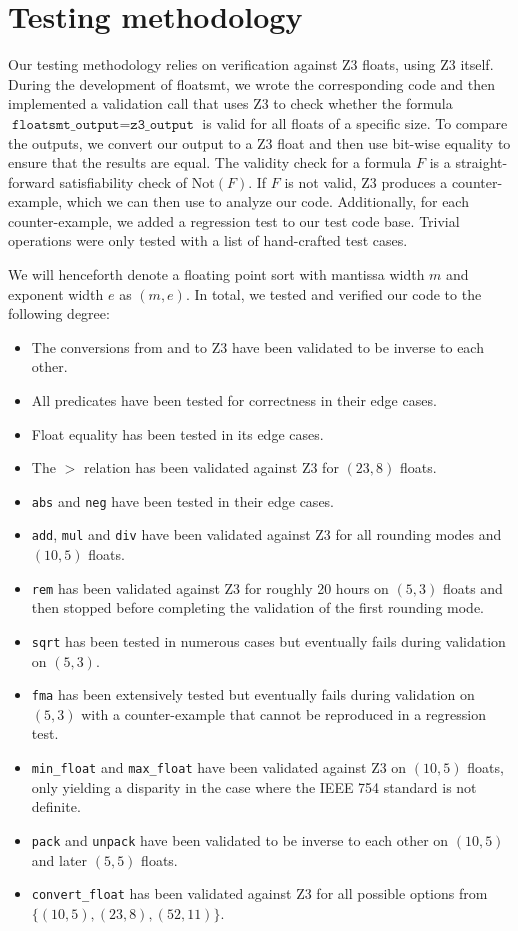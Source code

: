 \documentclass[a4paper,UKenglish,cleveref, autoref, thm-restate]{lipics-v2019}
\begin{document}
\section{Testing methodology}
Our testing methodology relies on verification against Z3 floats, using Z3 itself. During the development of floatsmt, we wrote the corresponding code and then implemented a validation call that uses Z3 to check whether the formula $\texttt{floatsmt\_output} = \texttt{z3\_output}$ is valid for all floats of a specific size. To compare the outputs, we convert our output to a Z3 float and then use bit-wise equality to ensure that the results are equal. The validity check for a formula $F$ is a straight-forward satisfiability check of $\text{Not}(F)$. If $F$ is not valid, Z3 produces a counter-example, which we can then use to analyze our code. Additionally, for each counter-example, we added a regression test to our test code base. Trivial operations were only tested with a list of hand-crafted test cases.

We will henceforth denote a floating point sort with mantissa width $m$ and exponent width $e$ as $(m, e)$. In total, we tested and verified our code to the following degree:
\begin{itemize}
	\item The conversions from and to Z3 have been validated to be inverse to each other.
	\item All predicates have been tested for correctness in their edge cases.
	\item Float equality has been tested in its edge cases.
	\item The $>$ relation has been validated against Z3 for $(23, 8)$ floats.
	\item \verb|abs| and \verb|neg| have been tested in their edge cases.
	\item \verb|add|, \verb|mul| and \verb|div| have been validated against Z3 for all rounding modes and $(10, 5)$ floats.
	\item \verb|rem| has been validated against Z3 for roughly 20 hours on $(5, 3)$ floats and then stopped before completing the validation of the first rounding mode.
	\item \verb|sqrt| has been tested in numerous cases but eventually fails during validation on $(5, 3)$.
	\item \verb|fma| has been extensively tested but eventually fails during validation on $(5, 3)$ with a counter-example that cannot be reproduced in a regression test.
	\item \verb|min_float| and \verb|max_float| have been validated against Z3 on $(10, 5)$ floats, only yielding a disparity in the case where the IEEE 754 standard is not definite.
	\item \verb|pack| and \verb|unpack| have been validated to be inverse to each other on $(10, 5)$ and later $(5, 5)$ floats.
	\item \verb|convert_float| has been validated against Z3 for all possible options from \\ $\{(10, 5), (23, 8), (52, 11)\}$.
\end{itemize}
\end{document}
